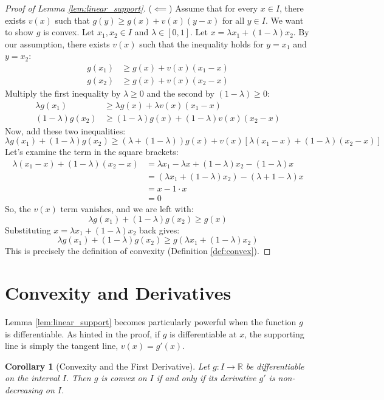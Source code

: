\documentclass[11pt]{article}
\newtheorem{corollary}[theorem]{Corollary}
\theoremstyle{definition}
\theoremstyle{remark}
\newcommand{\lambdaa}{\lambda} %
\begin{document}
\begin{proof}[Proof of Lemma \ref{lem:linear_support}]
($\impliedby$) Assume that for every $x \in I$, there exists $v(x)$ such that $g(y) \ge g(x) + v(x)(y-x)$ for all $y \in I$. We want to show $g$ is convex.
Let $x_1, x_2 \in I$ and $\lambdaa \in [0, 1]$. Let $x = \lambdaa x_1 + (1-\lambdaa) x_2$. By our assumption, there exists $v(x)$ such that the inequality holds for $y=x_1$ and $y=x_2$:
\begin{align*}
g(x_1) &\ge g(x) + v(x)(x_1 - x) \\
g(x_2) &\ge g(x) + v(x)(x_2 - x)
\end{align*}
Multiply the first inequality by $\lambdaa \ge 0$ and the second by $(1-\lambdaa) \ge 0$:
\begin{align*}
\lambdaa g(x_1) &\ge \lambdaa g(x) + \lambdaa v(x)(x_1 - x) \\
(1-\lambdaa) g(x_2) &\ge (1-\lambdaa) g(x) + (1-\lambdaa) v(x)(x_2 - x)
\end{align*}
Now, add these two inequalities:
\[
\lambdaa g(x_1) + (1-\lambdaa) g(x_2) \ge (\lambdaa + (1-\lambdaa)) g(x) + v(x) [ \lambdaa(x_1 - x) + (1-\lambdaa)(x_2 - x) ]
\]
Let's examine the term in the square brackets:
\begin{align*}
\lambdaa(x_1 - x) + (1-\lambdaa)(x_2 - x) &= \lambdaa x_1 - \lambdaa x + (1-\lambdaa) x_2 - (1-\lambdaa) x \\
&= (\lambdaa x_1 + (1-\lambdaa) x_2) - (\lambdaa + 1 - \lambdaa) x \\
&= x - 1 \cdot x \\
&= 0
\end{align*}
So, the $v(x)$ term vanishes, and we are left with:
\[
\lambdaa g(x_1) + (1-\lambdaa) g(x_2) \ge g(x)
\]
Substituting $x = \lambdaa x_1 + (1-\lambdaa) x_2$ back gives:
\[
\lambdaa g(x_1) + (1-\lambdaa) g(x_2) \ge g(\lambdaa x_1 + (1-\lambdaa) x_2)
\]
This is precisely the definition of convexity (Definition \ref{def:convex}).
\end{proof}

\section{Convexity and Derivatives}

Lemma \ref{lem:linear_support} becomes particularly powerful when the function $g$ is differentiable. As hinted in the proof, if $g$ is differentiable at $x$, the supporting line is simply the tangent line, $v(x) = g'(x)$.

\begin{corollary}[Convexity and the First Derivative] \label{cor:first_deriv}
Let $g: I \to \mathbb{R}$ be differentiable on the interval $I$. Then $g$ is convex on $I$ if and only if its derivative $g'$ is non-decreasing on $I$.
\end{corollary}
\end{document}
